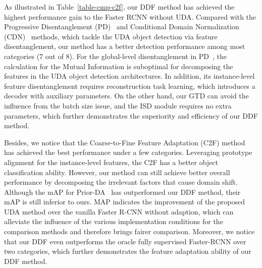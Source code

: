 \documentclass[journal]{IEEEtran}
\begin{document}
As illustrated in Table~\ref{table-cmp-c2f}, our DDF method has achieved the highest performance gain to the Faster RCNN without UDA. Compared with the Progressive Disentanglement (PD)~\cite{wu2021instance} and Conditional Domain Normalization (CDN)~\cite{su2020adapting} methods, which tackle the UDA object detection via feature disentanglement, our method has a better detection performance among most categories (7 out of 8). For the global-level disentanglement in PD~\cite{wu2021instance}, the calculation for the Mutual Information is suboptimal for decomposing the features in the UDA object detection architectures. In addition, its instance-level feature disentanglement requires reconstruction task learning, which introduces a decoder with auxiliary parameters. On the other hand, our GTD can avoid the influence from the batch size issue, and the ISD module requires no extra parameters, which further demonstrates the superiority and efficiency of our DDF method. {}

Besides, we notice that the Coarse-to-Fine Feature Adaptation (C2F) method~\cite{zheng2020cross} has achieved the best performance under a few categories. Leveraging prototype alignment for the instance-level features, the C2F has a better object classification ability. However, our method can still achieve better overall performance by decomposing the irrelevant factors that cause domain shift. Although the mAP for Prior-DA~\cite{sindagi2020prior} has outperformed our DDF method, their mAP is still inferior to ours. MAP indicates the improvement of the proposed UDA method over the vanilla Faster R-CNN without adaption, which can alleviate the influence of the various implementation conditions for the comparison methods and therefore brings fairer comparison. Moreover, we notice that our DDF even outperforms the oracle fully supervised Faster-RCNN over two categories, which further demonstrates the feature adaptation ability of our DDF method. 
\end{document}
